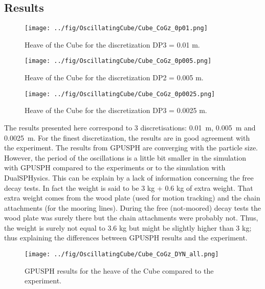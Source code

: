\documentclass{../GPUSPHtemplate}
\begin{document}
\subsection{Results}

\begin{figure}[H]
    \centering
    \texttt{[image: ../fig/OscillatingCube/Cube\_CoGz\_0p01.png]}
    \caption{Heave of the Cube for the discretization DP3 = 0.01 m.}
    \label{fig:CubeDYN0p01}
\end{figure}

\begin{figure}[H]
    \centering
    \texttt{[image: ../fig/OscillatingCube/Cube\_CoGz\_0p005.png]}
    \caption{Heave of the Cube for the discretization DP2 = 0.005 m.}
    \label{fig:CubeDYN0p005}
\end{figure}

\begin{figure}[H]
    \centering
    \texttt{[image: ../fig/OscillatingCube/Cube\_CoGz\_0p0025.png]}
    \caption{Heave of the Cube for the discretization DP3 = 0.0025 m.}
    \label{fig:CubeDYN0p0025}
\end{figure}

The results presented here correspond to 3 discretisations: 0.01~m, 0.005~m and 0.0025~m.
For the finest discretization, the results are in good agreement with the experiment.
The results from GPUSPH are converging with the particle size.
However, the period of the oscillations is a little bit smaller in the simulation with GPUSPH compared to
the experiments or to the simulation with DualSPHysics. This can be explain by a lack of information concerning
the free decay tests. In fact the weight is said to be 3 kg + 0.6 kg of extra weight. That extra weight comes
from the wood plate (used for motion tracking) and the chain attachments (for the mooring lines).
During the free (not-moored) decay tests the wood plate was surely there but the chain attachments were probably not.
Thus, the weight is surely not equal to 3.6 kg but might be slightly higher than 3 kg; thus explaining the
differences between GPUSPH results and the experiment.\\  

\begin{figure}[H]
    \centering
    \texttt{[image: ../fig/OscillatingCube/Cube\_CoGz\_DYN\_all.png]}
    \caption{GPUSPH results for the heave of the Cube compared to the experiment.}
    \label{fig:CubeDYNall}
\end{figure}

  

\end{document}
